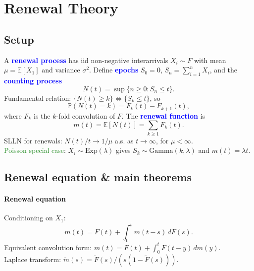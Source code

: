 \section{Renewal Theory}
\subsection{Setup}
A \textcolor{Blue}{\textbf{renewal process}} has iid non-negative interarrivals
$X_i \sim F$ with mean $\mu = \mathbb{E}[X_1]$ and variance $\sigma^2$. Define
\textcolor{Blue}{\textbf{epochs}} $S_0 = 0$, $S_n = \sum_{i=1}^{n} X_i$, and
the \textcolor{Blue}{\textbf{counting process}}
\[N(t) = \sup\{n \ge 0 : S_n \le t\}.\]
\textcolor{Bittersweet}{Fundamental relation}: $\{N(t) \ge k\} \iff \{S_k \le t\}$, so
\[\mathbb{P}(N(t) = k) = F_k(t) - F_{k+1}(t),\]
where $F_k$ is the $k$-fold convolution of $F$. The
\textcolor{Blue}{\textbf{renewal function}} is
\[m(t) = \mathbb{E}[N(t)] = \sum_{k \ge 1} F_k(t).\]
\textcolor{Bittersweet}{SLLN for renewals}: $N(t)/t \to 1/\mu$ a.s. as $t \to
\infty$, for $\mu < \infty$.\\
\textcolor{ForestGreen}{Poisson special case}: $X_i \sim \mathrm{Exp}(\lambda)$
gives $S_k \sim \mathrm{Gamma}(k, \lambda)$ and $m(t) = \lambda t$.

\subsection{Renewal equation \& main theorems}
\paragraph{Renewal equation} Conditioning on $X_1$:
\[m(t) = F(t) + \int_0^t m(t-s)\,dF(s).\]
Equivalent convolution form: $m(t) = F(t) + \int_0^t F(t-y)\,dm(y)$.\\
\textcolor{Bittersweet}{Laplace transform}: $\tilde m(s) = \tilde F(s)/(s(1 -
\tilde F(s)))$.

